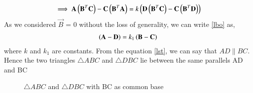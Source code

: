 \documentclass[journal,12pt,twocolumn]{IEEEtran}
\begin{document}
\begin{align}
    \label{lbo}
    \implies \mathbf{A}\left(\mathbf{B} ^T \mathbf{C}\right) - \mathbf{C}\left(\mathbf{B} ^T \mathbf{A}\right) = k\left(\mathbf{D}\left(\mathbf{B} ^T \mathbf{C}\right)-\mathbf{C}\left(\mathbf{B} ^T \mathbf{D}\right)\right)
\end{align}
As we considered $\vec{B}$ = 0 without the loss of generality, we can write \eqref{lbo} as,
\begin{align}
    \label{lst}
    \left(\mathbf{A}-\mathbf{D}\right)=k_1\left(\mathbf{B}-\mathbf{C}\right)
\end{align}
where $k$ and $k_1$ are constants. From the equation \eqref{lst}, we can say that $AD \parallel BC$. Hence the two triangles $\triangle ABC$ and $\triangle DBC$ lie between the same parallels AD and BC
\begin{figure}[!ht] \label{fig:triangle_abc}
\centering
{}
\caption{$\triangle ABC$ and $\triangle DBC$ with BC as common base}
\label{fig:solutions/1/2/two}
\end{figure} \\
\end{document}
